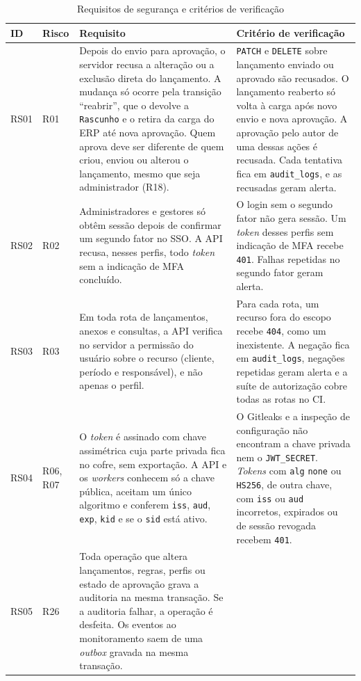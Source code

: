 \documentclass[conference]{IEEEtran}
\begin{document}
\begin{table}[!t]
\centering
\caption{Requisitos de segurança e critérios de verificação}
\label{tab:requisitos}
\footnotesize
\renewcommand{\arraystretch}{1.15}
\begin{tabularx}{\textwidth}{@{}l l Y Y@{}}
\hline
\textbf{ID} & \textbf{Risco} & \textbf{Requisito} & \textbf{Critério de verificação} \\
\hline
RS01 & R01 &
Depois do envio para aprovação, o servidor recusa a alteração ou a exclusão direta do lançamento. A mudança só ocorre pela transição ``reabrir'', que o devolve a \texttt{Rascunho} e o retira da carga do ERP até nova aprovação. Quem aprova deve ser diferente de quem criou, enviou ou alterou o lançamento, mesmo que seja administrador (R18). &
\texttt{PATCH} e \texttt{DELETE} sobre lançamento enviado ou aprovado são recusados. O lançamento reaberto só volta à carga após novo envio e nova aprovação. A aprovação pelo autor de uma dessas ações é recusada. Cada tentativa fica em \texttt{audit\_logs}, e as recusadas geram alerta. \\
RS02 & R02 &
Administradores e gestores só obtêm sessão depois de confirmar um segundo fator no SSO. A API recusa, nesses perfis, todo \textit{token} sem a indicação de MFA concluído. &
O login sem o segundo fator não gera sessão. Um \textit{token} desses perfis sem indicação de MFA recebe \texttt{401}. Falhas repetidas no segundo fator geram alerta. \\
RS03 & R03 &
Em toda rota de lançamentos, anexos e consultas, a API verifica no servidor a permissão do usuário sobre o recurso (cliente, período e responsável), e não apenas o perfil. &
Para cada rota, um recurso fora do escopo recebe \texttt{404}, como um inexistente. A negação fica em \texttt{audit\_logs}, negações repetidas geram alerta e a suíte de autorização cobre todas as rotas no CI. \\
RS04 & R06, R07 &
O \textit{token} é assinado com chave assimétrica cuja parte privada fica no cofre, sem exportação. A API e os \textit{workers} conhecem só a chave pública, aceitam um único algoritmo e conferem \texttt{iss}, \texttt{aud}, \texttt{exp}, \texttt{kid} e se o \texttt{sid} está ativo. &
O Gitleaks e a inspeção de configuração não encontram a chave privada nem o \texttt{JWT\_SECRET}. \textit{Tokens} com \texttt{alg} \texttt{none} ou \texttt{HS256}, de outra chave, com \texttt{iss} ou \texttt{aud} incorretos, expirados ou de sessão revogada recebem \texttt{401}. \\
RS05 & R26 &
Toda operação que altera lançamentos, regras, perfis ou estado de aprovação grava a auditoria na mesma transação. Se a auditoria falhar, a operação é desfeita. Os eventos ao monitoramento saem de uma \textit{outbox} gravada na mesma transação. &

\end{tabularx}
\end{table}
\end{document}
